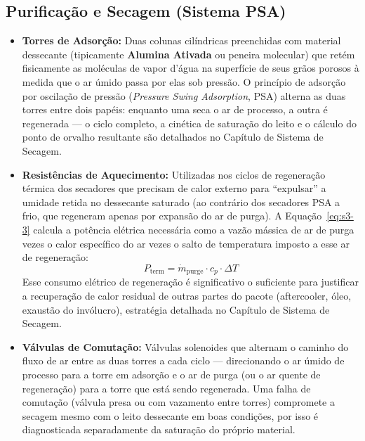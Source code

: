 \documentclass[12pt,a4paper]{article}
\numberwithin{equation}{section}
\numberwithin{table}{section}
\numberwithin{figure}{section}
\begin{document}
	\subsection{\textbf{Purificação e Secagem (Sistema PSA)}}
	\begin{itemize}
		\item \textbf{Torres de Adsorção:} Duas colunas cilíndricas preenchidas com material dessecante (tipicamente \textbf{Alumina Ativada} ou peneira molecular) que retém fisicamente as moléculas de vapor d'água na superfície de seus grãos porosos à medida que o ar úmido passa por elas sob pressão. O princípio de adsorção por oscilação de pressão (\textit{Pressure Swing Adsorption}, PSA) alterna as duas torres entre dois papéis: enquanto uma seca o ar de processo, a outra é regenerada — o ciclo completo, a cinética de saturação do leito e o cálculo do ponto de orvalho resultante são detalhados no Capítulo de Sistema de Secagem.
		\item \textbf{Resistências de Aquecimento:} Utilizadas nos ciclos de regeneração térmica dos secadores que precisam de calor externo para ``expulsar'' a umidade retida no dessecante saturado (ao contrário dos secadores PSA a frio, que regeneram apenas por expansão do ar de purga). A Equação~\eqref{eq:s3-3} calcula a potência elétrica necessária como a vazão mássica de ar de purga vezes o calor específico do ar vezes o salto de temperatura imposto a esse ar de regeneração:
		\begin{equation}\label{eq:s3-3}
 P_{\text{term}} = \dot{m}_{\text{purge}} \cdot c_p \cdot \Delta T
\end{equation}
		Esse consumo elétrico de regeneração é significativo o suficiente para justificar a recuperação de calor residual de outras partes do pacote (aftercooler, óleo, exaustão do invólucro), estratégia detalhada no Capítulo de Sistema de Secagem.
		\item \textbf{Válvulas de Comutação:} Válvulas solenoides que alternam o caminho do fluxo de ar entre as duas torres a cada ciclo — direcionando o ar úmido de processo para a torre em adsorção e o ar de purga (ou o ar quente de regeneração) para a torre que está sendo regenerada. Uma falha de comutação (válvula presa ou com vazamento entre torres) compromete a secagem mesmo com o leito dessecante em boas condições, por isso é diagnosticada separadamente da saturação do próprio material.
	\end{itemize}
	
\end{document}
